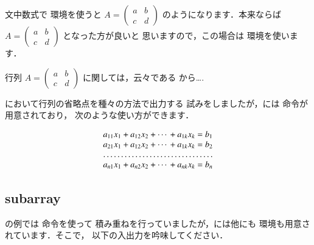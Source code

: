 \begin{inout}
文中数式で  環境を使うと
 $A = \left(\begin{matrix} a & b\\ c & d\end{matrix} \right)$
のようになります．本来ならば $A = \left(\begin{smallmatrix}
  a & b\\ c & d\end{smallmatrix}\right)$ となった方が良いと
思いますので，この場合は  環境を使います．

\begin{inout}
行列 $A = \left(\begin{smallmatrix}
  a & b\\ c & d\end{smallmatrix}
\right)$ に関しては，云々である
から\ldots.
\end{inout}

において行列の省略点を種々の方法で出力する
試みをしましたが，\AmSLaTeX には 命令が用意されており，
次のような使い方ができます．

\begin{inout}
\begin{displaymath}
 \begin{array}{*{2}{c@{\:+\:}}%
   @{\cdots\:+\:}c@{\;=\;}c}
 a_{11}x_1 & a_{12}x_2 & a_{1k}x_k
    & b_1\\
 a_{21}x_1 & a_{12}x_2 & a_{1k}x_k
    & b_2\\
 \hdotsfor{4}\\
 a_{n1}x_1 & a_{n2}x_2 & a_{nk}x_k
   & b_n\\
 \end{array}
\end{displaymath}
\end{inout}
 
\begin{usage}
\end{usage}

\subsection{subarray}

の例では 命令を使って
積み重ねを行っていましたが，には他にも
環境も用意されています．そこで，
以下の入出力を吟味してください．


\end{inout}
